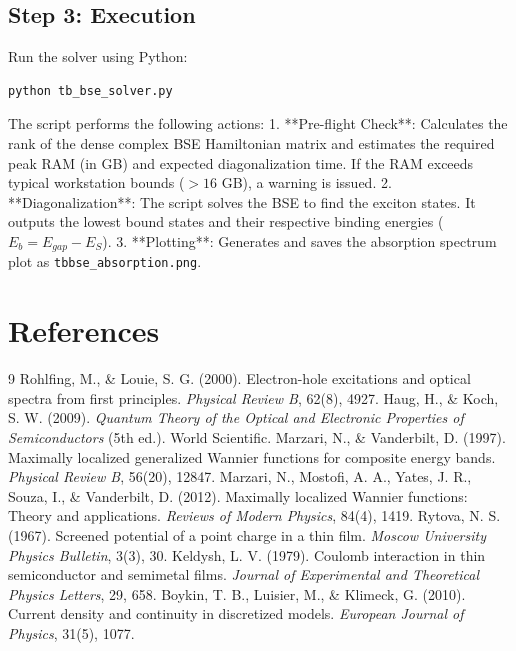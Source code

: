 \documentclass[11pt, a4paper]{article}
\begin{document}
\subsection{Step 3: Execution}
Run the solver using Python:
\begin{verbatim}
python tb_bse_solver.py
\end{verbatim}
The script performs the following actions:
1. **Pre-flight Check**: Calculates the rank of the dense complex BSE Hamiltonian matrix and estimates the required peak RAM (in GB) and expected diagonalization time. If the RAM exceeds typical workstation bounds ($>16$ GB), a warning is issued.
2. **Diagonalization**: The script solves the BSE to find the exciton states. It outputs the lowest bound states and their respective binding energies ($E_b = E_{gap} - E_S$).
3. **Plotting**: Generates and saves the absorption spectrum plot as \texttt{tbbse\_absorption.png}.

\section{References}
\begin{thebibliography}{9}
 Rohlfing, M., \& Louie, S. G. (2000). Electron-hole excitations and optical spectra from first principles. \textit{Physical Review B}, 62(8), 4927.
 Haug, H., \& Koch, S. W. (2009). \textit{Quantum Theory of the Optical and Electronic Properties of Semiconductors} (5th ed.). World Scientific.
 Marzari, N., \& Vanderbilt, D. (1997). Maximally localized generalized Wannier functions for composite energy bands. \textit{Physical Review B}, 56(20), 12847.
 Marzari, N., Mostofi, A. A., Yates, J. R., Souza, I., \& Vanderbilt, D. (2012). Maximally localized Wannier functions: Theory and applications. \textit{Reviews of Modern Physics}, 84(4), 1419.
 Rytova, N. S. (1967). Screened potential of a point charge in a thin film. \textit{Moscow University Physics Bulletin}, 3(3), 30.
 Keldysh, L. V. (1979). Coulomb interaction in thin semiconductor and semimetal films. \textit{Journal of Experimental and Theoretical Physics Letters}, 29, 658.
 Boykin, T. B., Luisier, M., \& Klimeck, G. (2010). Current density and continuity in discretized models. \textit{European Journal of Physics}, 31(5), 1077.
\end{thebibliography}
\end{document}
